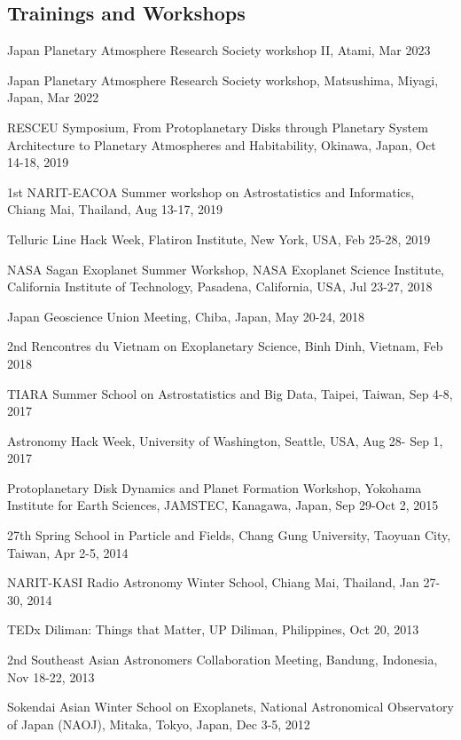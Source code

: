\documentclass[12pt,letterpaper]{article}
\begin{document}
\subsection{Trainings and Workshops}
\begin{list}{}{\cvlist}
    \item Japan Planetary Atmosphere Research Society workshop II, Atami, Mar 2023
    \item Japan Planetary Atmosphere Research Society workshop, Matsushima, Miyagi, Japan, Mar 2022
    \item RESCEU Symposium, From Protoplanetary Disks through Planetary System Architecture to Planetary Atmospheres and Habitability, Okinawa, Japan, Oct 14-18, 2019
    \item 1st NARIT-EACOA Summer workshop on Astrostatistics and Informatics, Chiang Mai, Thailand, Aug 13-17, 2019
    \item Telluric Line Hack Week, Flatiron Institute, New York, USA, Feb 25-28, 2019
    \item NASA Sagan Exoplanet Summer Workshop, NASA Exoplanet Science Institute, California Institute of Technology, Pasadena, California, USA, Jul 23-27, 2018
    \item Japan Geoscience Union Meeting, Chiba, Japan, May 20-24, 2018
    \item 2nd Rencontres du Vietnam on Exoplanetary Science, Binh Dinh, Vietnam, Feb 2018
    \item TIARA Summer School on Astrostatistics and Big Data, Taipei, Taiwan, Sep 4-8, 2017
    \item Astronomy Hack Week, University of Washington, Seattle, USA, Aug 28- Sep 1, 2017
    \item Protoplanetary Disk Dynamics and Planet Formation Workshop, Yokohama Institute for Earth Sciences, JAMSTEC, Kanagawa, Japan, Sep 29-Oct 2, 2015
    \item 27th Spring School in Particle and Fields, Chang Gung University, Taoyuan City, Taiwan, Apr 2-5, 2014
    \item NARIT-KASI Radio Astronomy Winter School, Chiang Mai, Thailand, Jan 27-30, 2014
    \item TEDx Diliman: Things that Matter, UP Diliman, Philippines, Oct 20, 2013
    \item 2nd Southeast Asian Astronomers Collaboration Meeting, Bandung, Indonesia, Nov 18-22, 2013
    \item Sokendai Asian Winter School on Exoplanets, National Astronomical Observatory of Japan (NAOJ), Mitaka, Tokyo, Japan, Dec 3-5, 2012

\end{list}
\end{document}
